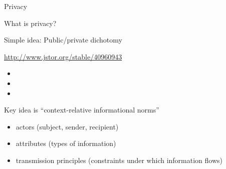 \documentclass{beamer}
\begin{document}
\begin{frame}

\begin{center}
\Large{Privacy}
\end{center}

\end{frame}
\begin{frame}

What is privacy?

\end{frame}
\begin{frame}

Simple idea: Public/private dichotomy

\end{frame}
\begin{frame}

\begin{center}
\end{center}

\vfill
\tiny{\url{http://www.jstor.org/stable/40960943}}

\end{frame}
\begin{frame}

\begin{itemize}
\item {}
\item {}
\item {}
\end{itemize}

\end{frame}
\begin{frame}

Key idea is ``context-relative informational norms''\\
\begin{itemize}
\item actors (subject, sender, recipient)
\item attributes (types of information)
\item transmission principles (constraints under which information flows)
\end{itemize}

\end{frame}
\end{document}
